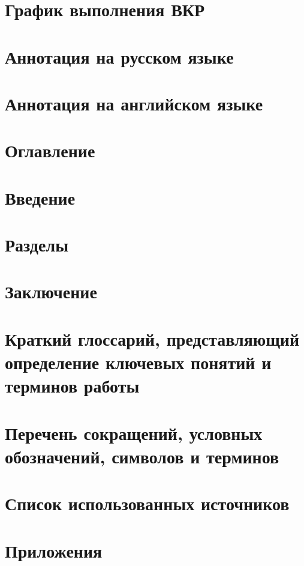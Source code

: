 \documentclass[a4paper,14pt]{extreport} %
\begin{document}
	
	\section{График выполнения ВКР}
	\section{Аннотация на русском языке}
	\section{Аннотация на английском языке}
	\section{Оглавление}
	\section{Введение}
	\section{Разделы}
	\section{Заключение}
	\section{Краткий глоссарий, представляющий определение ключевых понятий и терминов работы}
	\section{Перечень сокращений, условных обозначений, символов и терминов}
	\section{Список использованных источников}
	\section{Приложения}
\end{document}
